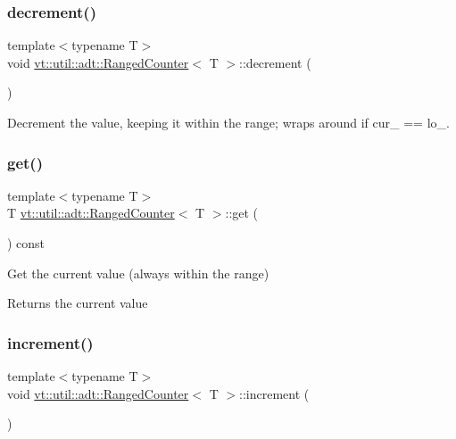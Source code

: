 \subsubsection{\texorpdfstring{decrement()}{decrement()}}
{\footnotesize\ttfamily template$<$typename T$>$ \\
void \hyperlink{structvt_1_1util_1_1adt_1_1_ranged_counter}{vt\+::util\+::adt\+::\+Ranged\+Counter}$<$ T $>$\+::decrement (\begin{DoxyParamCaption}{ }\end{DoxyParamCaption})\hspace{0.3cm}{\ttfamily [inline]}}



Decrement the value, keeping it within the range; wraps around if {\ttfamily cur\+\_\+} == lo\+\_\+. 

\mbox{\label{structvt_1_1util_1_1adt_1_1_ranged_counter_a1cb23d5e9a3394ce6c2aac36aa6bb744}} 
\subsubsection{\texorpdfstring{get()}{get()}}
{\footnotesize\ttfamily template$<$typename T$>$ \\
T \hyperlink{structvt_1_1util_1_1adt_1_1_ranged_counter}{vt\+::util\+::adt\+::\+Ranged\+Counter}$<$ T $>$\+::get (\begin{DoxyParamCaption}{ }\end{DoxyParamCaption}) const\hspace{0.3cm}{\ttfamily [inline]}}



Get the current value (always within the range) 

\begin{DoxyReturn}{Returns}
the current value 
\end{DoxyReturn}
\mbox{\label{structvt_1_1util_1_1adt_1_1_ranged_counter_aa210bb5eb729be245581c3219e179584}} 
\subsubsection{\texorpdfstring{increment()}{increment()}}
{\footnotesize\ttfamily template$<$typename T$>$ \\
void \hyperlink{structvt_1_1util_1_1adt_1_1_ranged_counter}{vt\+::util\+::adt\+::\+Ranged\+Counter}$<$ T $>$\+::increment (\begin{DoxyParamCaption}{ }\end{DoxyParamCaption})\hspace{0.3cm}{\ttfamily [inline]}}




